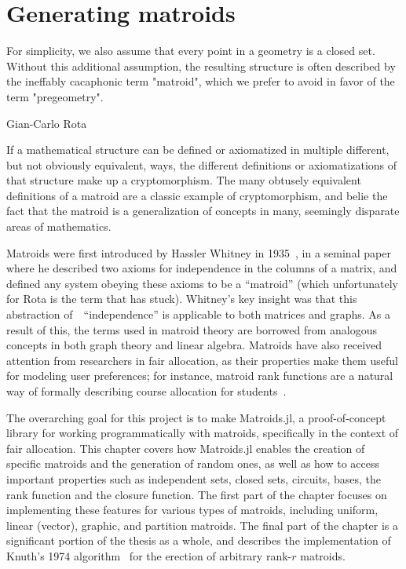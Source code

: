 \chapter{Generating matroids}
\epigraph{For simplicity, we also assume that every point in a geometry is a closed set. Without this additional assumption, the resulting structure is often described by the ineffably cacaphonic term "matroid", which we prefer to avoid in favor of the term "pregeometry".}{Gian-Carlo Rota \cite{crapo_rota_1970}}

If a mathematical structure can be defined or axiomatized in multiple different, but not obviously equivalent, ways, the different definitions or axiomatizations of that structure make up a cryptomorphism. The many obtusely equivalent definitions of a matroid are a classic example of cryptomorphism, and belie the fact that the matroid is a generalization of concepts in many, seemingly disparate areas of mathematics.

Matroids were first introduced by Hassler Whitney in 1935~\cite{whitney-1935}, in a seminal paper where he described two axioms for independence in the columns of a matrix, and defined any system obeying these axioms to be a ``matroid'' (which unfortunately for Rota is the term that has stuck). Whitney's key insight was that this abstraction of~~``independence'' is applicable to both matrices and graphs. As a result of this, the terms used in matroid theory are borrowed from analogous concepts in both graph theory and linear algebra. Matroids have also received attention from researchers in fair allocation, as their properties make them useful for modeling user preferences; for instance, matroid rank functions are a natural way of formally describing course allocation for students~\cite{benabbou-2021}. 

The overarching goal for this project is to make Matroids.jl, a proof-of-concept library for working programmatically with matroids, specifically in the context of fair allocation. This chapter covers how Matroids.jl enables the creation of specific matroids and the generation of random ones, as well as how to access important properties such as independent sets, closed sets, circuits, bases, the rank function and the closure function. The first part of the chapter focuses on implementing these features for various types of matroids, including uniform, linear (vector), graphic, and partition matroids. The final part of the chapter is a significant portion of the thesis as a whole, and describes the implementation of Knuth's 1974 algorithm~\cite{knuth-1975} for the erection of arbitrary rank-$r$ matroids.






